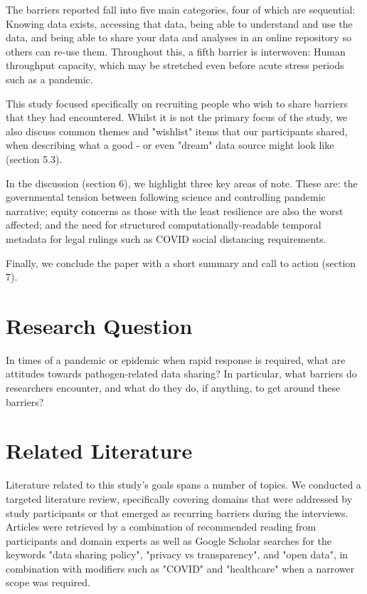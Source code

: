 \documentclass{CUP-JNL-DAP}%
\begin{document}
The barriers reported fall into five main categories, four of which are sequential: Knowing data exists, accessing that data, being able to understand and use the data, and being able to share your data and analyses in an online repository so others can re-use them. Throughout this, a fifth barrier is interwoven: Human throughput capacity, which may be stretched even before acute stress periods such as a pandemic.

This study focused specifically on recruiting people who wish to share barriers that they had encountered. Whilst it is not the primary focus of the study, we also discuss common themes and "wishlist" items that our participants shared, when describing what a good - or even "dream" data source might look like (section 5.3).

In the discussion (section 6), we highlight three key areas of note. These are: the governmental tension between following science and controlling pandemic narrative; equity concerns as those with the least resilience are also the worst affected; and the need for structured computationally-readable temporal metadata for legal rulings such as COVID social distancing requirements. 

Finally, we conclude the paper with a short summary and call to action (section 7). 

\section{Research Question}
In times of a pandemic or epidemic when rapid response is required, what are attitudes towards pathogen-related data sharing? In particular, what barriers do researchers encounter, and what do they do, if anything, to get around these barriers? 

\section{Related Literature}

Literature related to this study's goals spans a number of topics. We conducted a targeted literature review, specifically covering domains that were addressed by study participants or that emerged as recurring barriers during the interviews. Articles were retrieved by a combination of recommended reading from participants and domain experts as well as Google Scholar searches for the keywords "data sharing policy", "privacy vs transparency", and "open data", in combination with modifiers such as "COVID" and "healthcare" when a narrower scope was required.
\end{document}

